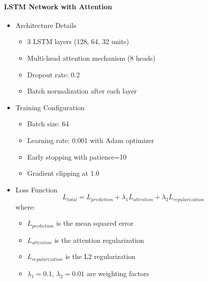 \documentclass[conference]{IEEEtran}
\begin{document}
\paragraph{LSTM Network with Attention}
\begin{itemize}
    \item Architecture Details
    \begin{itemize}
        \item 3 LSTM layers (128, 64, 32 units)
        \item Multi-head attention mechanism (8 heads)
        \item Dropout rate: 0.2
        \item Batch normalization after each layer
    \end{itemize}
    
    \item Training Configuration
    \begin{itemize}
        \item Batch size: 64
        \item Learning rate: 0.001 with Adam optimizer
        \item Early stopping with patience=10
        \item Gradient clipping at 1.0
    \end{itemize}
    
    \item Loss Function
    \begin{equation}
    L_{total} = L_{prediction} + \lambda_1 L_{attention} + \lambda_2 L_{regularization}
    \end{equation}
    where:
    \begin{itemize}
        \item $L_{prediction}$ is the mean squared error
        \item $L_{attention}$ is the attention regularization
        \item $L_{regularization}$ is the L2 regularization
        \item $\lambda_1 = 0.1$, $\lambda_2 = 0.01$ are weighting factors
    \end{itemize}
\end{itemize}
\end{document}
